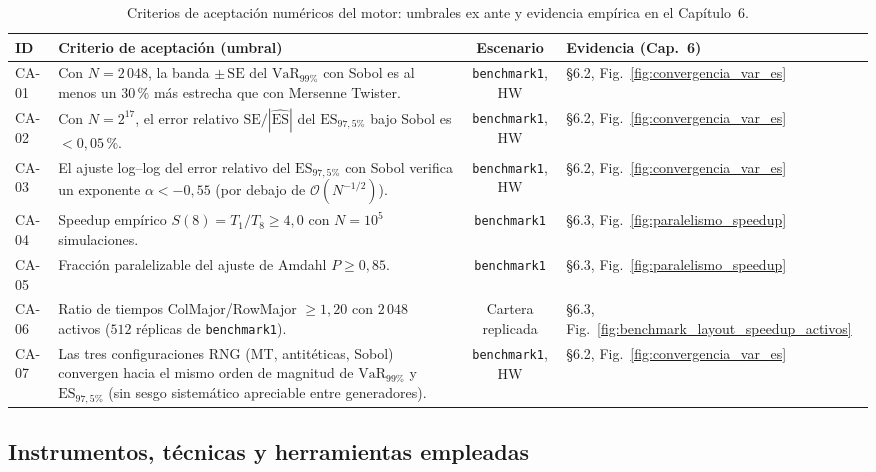 \documentclass[11pt]{article}
\begin{document}
\begin{table}[h]
\centering
\small
\setlength{\tabcolsep}{4pt}
\begin{tabularx}{\textwidth}{|l|X|c|l|}
\hline
\textbf{ID} & \textbf{Criterio de aceptación (umbral)} & \textbf{Escenario} & \textbf{Evidencia (Cap.~6)} \\ \hline
CA-01 &
Con $N=2\,048$, la banda $\pm\,\text{SE}$ del $\text{VaR}_{99\%}$ con Sobol es al menos un $30\,\%$ más estrecha que con Mersenne Twister. &
\texttt{benchmark1}, HW &
§6.2, Fig.~\ref{fig:convergencia_var_es} \\ \hline
CA-02 &
Con $N=2^{17}$, el error relativo $\text{SE}/|\hat{\text{ES}}|$ del $\text{ES}_{97{,}5\%}$ bajo Sobol es $< 0{,}05\,\%$. &
\texttt{benchmark1}, HW &
§6.2, Fig.~\ref{fig:convergencia_var_es} \\ \hline
CA-03 &
El ajuste log--log del error relativo del $\text{ES}_{97{,}5\%}$ con Sobol verifica un exponente $\alpha < -0{,}55$ (por debajo de $\mathcal{O}(N^{-1/2})$). &
\texttt{benchmark1}, HW &
§6.2, Fig.~\ref{fig:convergencia_var_es} \\ \hline
CA-04 &
Speedup empírico $S(8)=T_1/T_8 \ge 4{,}0$ con $N=10^5$ simulaciones. &
\texttt{benchmark1} &
§6.3, Fig.~\ref{fig:paralelismo_speedup} \\ \hline
CA-05 &
Fracción paralelizable del ajuste de Amdahl $P \ge 0{,}85$. &
\texttt{benchmark1} &
§6.3, Fig.~\ref{fig:paralelismo_speedup} \\ \hline
CA-06 &
Ratio de tiempos ColMajor/RowMajor $\ge 1{,}20$ con $2\,048$ activos ($512$ réplicas de \texttt{benchmark1}). &
Cartera replicada &
§6.3, Fig.~\ref{fig:benchmark_layout_speedup_activos} \\ \hline
CA-07 &
Las tres configuraciones RNG (MT, antitéticas, Sobol) convergen hacia el mismo orden de magnitud de $\text{VaR}_{99\%}$ y $\text{ES}_{97{,}5\%}$ (sin sesgo sistemático apreciable entre generadores). &
\texttt{benchmark1}, HW &
§6.2, Fig.~\ref{fig:convergencia_var_es} \\ \hline
\end{tabularx}
\caption{Criterios de aceptación numéricos del motor: umbrales ex ante y evidencia empírica en el Capítulo~6.}
\label{tab:criterios_aceptacion}
\end{table}
\subsection{Instrumentos, técnicas y herramientas empleadas}
\end{document}
